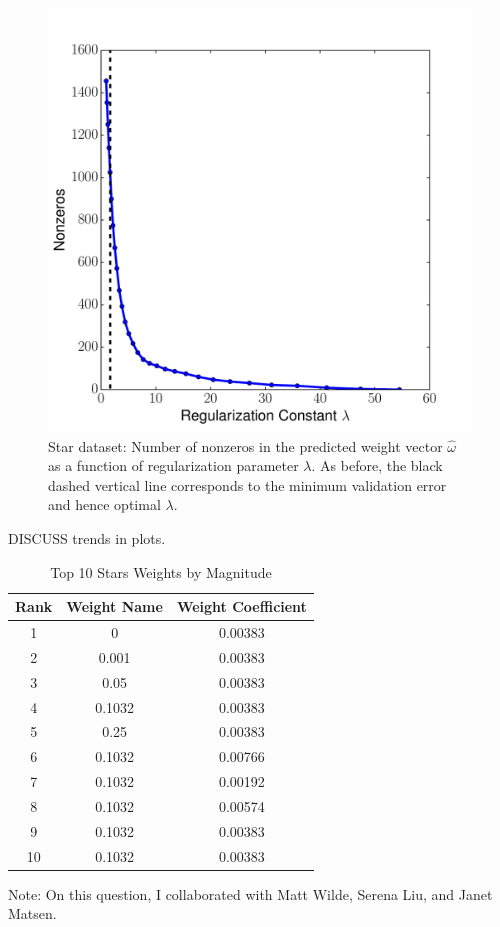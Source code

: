 \documentclass[12pt]{amsart}
\begin{document}
\begin{figure}
	\includegraphics[width=\columnwidth]{star_nonzeros.pdf}
    \caption{Star dataset: Number of nonzeros in the predicted weight vector $\hat{\omega}$ as a function of regularization parameter $\lambda$.  As before, the black dashed vertical line corresponds to the minimum validation error and hence optimal $\lambda$.}
    \label{fig:yelp_star_nonzeros}
\end{figure}

DISCUSS trends in plots.

\begin{table}
	\centering
	\caption{Top 10 Stars Weights by Magnitude}
	\begin{tabular}{ccc} 
		\hline
		Rank & Weight Name & Weight Coefficient \\
		\hline
		1 & 0 & 0.00383 \\
		2 & 0.001 & 0.00383 \\
		3 & 0.05 & 0.00383 \\
		4 & 0.1032 & 0.00383 \\
		5 & 0.25 & 0.00383  \\ 
		6 & 0.1032 & 0.00766  \\
		7 & 0.1032 & 0.00192  \\
		8 & 0.1032 & 0.00574  \\
		9 & 0.1032 & 0.00383 \\
		10 & 0.1032 & 0.00383 \\
		\hline
	\end{tabular}
	\label{tab:top_stars}
\end{table}


Note: On this question, I collaborated with Matt Wilde, Serena Liu, and Janet Matsen.
\end{document}
